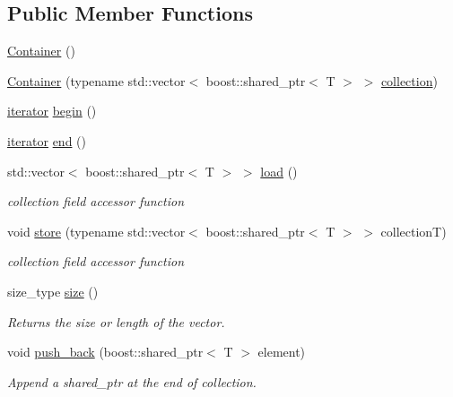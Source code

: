 \subsection*{Public Member Functions}
\begin{DoxyCompactItemize}
\item 
\hyperlink{class_container_ab17ce1f67243b28abcd4c8113a72524c}{Container} ()
\item 
\hyperlink{class_container_a161e09c0c1cbe40429df228f7db63972}{Container} (typename std::vector$<$ boost::shared\_\-ptr$<$ T $>$ $>$ \hyperlink{class_container_a6cc12233bceb7d72709320d2c57e3398}{collection})
\item 
\hyperlink{class_container_afe880028d8304353129f47cd1d28c20a}{iterator} \hyperlink{class_container_ac5e2a75311f6e6a690ca67603490ddb1}{begin} ()
\item 
\hyperlink{class_container_afe880028d8304353129f47cd1d28c20a}{iterator} \hyperlink{class_container_a266eabe62963d6909d3aca7f105e203e}{end} ()
\item 
std::vector$<$ boost::shared\_\-ptr$<$ T $>$ $>$ \hyperlink{class_container_a9161a87726434f8955398137c647947c}{load} ()
\begin{DoxyCompactList}\small\item\em collection field accessor function \end{DoxyCompactList}\item 
void \hyperlink{class_container_a601371159ddfee9ab29b676207a0cf75}{store} (typename std::vector$<$ boost::shared\_\-ptr$<$ T $>$ $>$ collectionT)
\begin{DoxyCompactList}\small\item\em collection field accessor function \end{DoxyCompactList}\item 
size\_\-type \hyperlink{class_container_a842c3d9eca81b78b59112fde9707b091}{size} ()
\begin{DoxyCompactList}\small\item\em Returns the size or length of the vector. \end{DoxyCompactList}\item 
void \hyperlink{class_container_afd87c69cb799ed7b434c29090083a285}{push\_\-back} (boost::shared\_\-ptr$<$ T $>$ element)
\begin{DoxyCompactList}\small\item\em Append a shared\_\-ptr at the end of collection. \end{DoxyCompactList}\item 

\end{DoxyCompactItemize}
